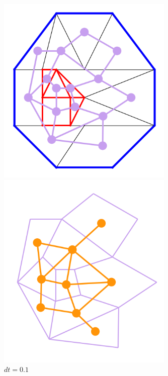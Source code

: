 \documentclass[10pt]{article}
\begin{document}
\begin{figure}[H]
    \centering
    \begin{minipage}{.33\textwidth}
        \centering
        \includegraphics[width=0.75\textwidth]{images/dual1}
        \caption{$dt=0.1$}
        \label{fig:prob1_6_2}
    \end{minipage}%
    \begin{minipage}{.33\textwidth}
        \centering
        \includegraphics[width=0.75\textwidth]{images/dual2}
        \caption{$dt=0.1$}
        \label{fig:prob1_6_2}

\end{minipage}
\end{figure}
\end{document}

